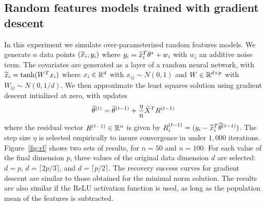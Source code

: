 \subsection{Random features models trained with gradient descent}

In this experiment we simulate over-parameterized random features models.
We generate $n$ data points $(\widetilde{x}_i, y_i)$ where
$y_i = \widetilde{x}_i^T \theta^* + w_i$ with $w_i$ an additive noise term. The covariates are generated
as a layer of a random neural network, with $\widetilde{x}_i = \tanh(W^Tx_i)$ where $x_i \in\mathbb{R}^d$ with $x_{ij} \sim N(0,1)$
and $W\in\mathbb{R}^{d\times p}$ with $W_{ij} \sim N(0, 1/d)$. We then approximate the least squares
solution using gradient descent intialized at zero, with updates
\begin{equation}
  \hat\theta^{(t)} = \hat\theta^{(t-1)} + \frac{\eta}{n} \wt{X}^T R^{(t-1)}
\end{equation}
where the residual vector $R^{(t-1)}\in\mathbb{R}^n$ is given by $R_i^{(t-1)} = (y_i - \widetilde{x}_i^ T\widehat\theta^{(t-1)})$.
The step size $\eta$ is selected empirically to insure convergence in under $1{,}000$ iterations.
Figure~\ref{fig:rf} shows two sets of results, for $n=50$ and $n=100$. For each value of the final dimension $p$,
three values of the original data dimension $d$ are selected: $d=p$, $d=\lceil 2p/3\rceil$,
and $d=\lceil p/2\rceil$. The recovery success curves for gradient descent are similar to those obtained for the minimal norm solution. The results are also similar if the ReLU activation function is used, as long as the population mean of the features is subtracted.

